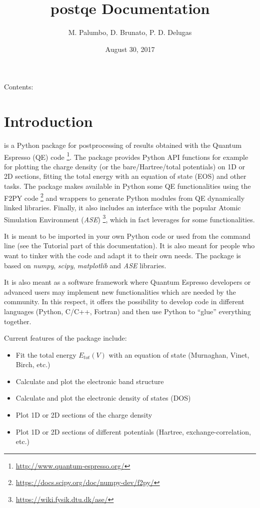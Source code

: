 \documentclass[letterpaper,10pt,english]{sphinxmanual}
\title{postqe Documentation}
\date{August 30, 2017}
\author{M. Palumbo, D. Brunato, P. D. Delugas}
\begin{document}
\maketitle
\tableofcontents
{}\label{index::doc}


Contents:


\chapter{Introduction}
\label{introduction:introduction}\label{introduction:id1}\label{introduction::doc}\label{introduction:welcome-to-postqe-s-documentation}
 is a Python package for postprocessing of results obtained with the Quantum Espresso (QE) code \footnote[1]{
\href{http://www.quantum-espresso.org/}{http://www.quantum-espresso.org/}
}. The package provides Python API functions for example for plotting the charge density (or the bare/Hartree/total potentials) on 1D or 2D sections, fitting the total energy with an equation of state (EOS) and other tasks. The package makes available in Python some QE functionalities using the F2PY code \footnote[2]{
\href{https://docs.scipy.org/doc/numpy-dev/f2py/}{https://docs.scipy.org/doc/numpy-dev/f2py/}
} and wrappers to generate Python modules from QE dynamically linked libraries. Finally, it also includes an interface with the popular Atomic Simulation Environment (\emph{ASE}) \footnote[3]{
\href{https://wiki.fysik.dtu.dk/ase/}{https://wiki.fysik.dtu.dk/ase/}
}, which in fact leverages for some functionalities.

It is meant to be imported in your own Python code or used from the command line (see the Tutorial part of this documentation). It is also meant for people who want to tinker with the code and adapt it to their own needs. The package is based on \emph{numpy}, \emph{scipy}, \emph{matplotlib} and \emph{ASE} libraries.

It is also meant as a software framework where Quantum Espresso developers or advanced users may implement new functionalities which are needed by the community. In this respect, it offers the possibility to develop code in different languages (Python, C/C++, Fortran) and then use Python to ``glue'' everything together.

Current features of the package include:
\begin{itemize}
\item {} 
Fit the total energy \(E_{tot}(V)\) with an equation of state (Murnaghan, Vinet, Birch, etc.)

\item {} 
Calculate and plot the electronic band structure

\item {} 
Calculate and plot the electronic density of states (DOS)

\item {} 
Plot 1D or 2D sections of the charge density

\item {} 
Plot 1D or 2D sections of different potentials (Hartree, exchange-correlation, etc.)

\end{itemize}
\end{document}
